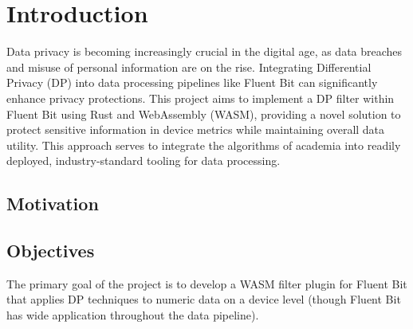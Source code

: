 \chapter{Introduction\label{chap:introduction}}

Data privacy is becoming increasingly crucial in the digital age, as data breaches and misuse of personal information are on the rise. Integrating Differential Privacy (DP) into data processing pipelines like Fluent Bit can significantly enhance privacy protections. This project aims to implement a DP filter within Fluent Bit using Rust and WebAssembly (WASM), providing a novel solution to protect sensitive information in device metrics while maintaining overall data utility. This approach serves to integrate the algorithms of academia into readily deployed, industry-standard tooling for data processing.

\section{Motivation}

\section{Objectives}
The primary goal of the project is to develop a WASM filter plugin for Fluent Bit that applies DP techniques to numeric data on a device level (though Fluent Bit has wide application throughout the data pipeline).

